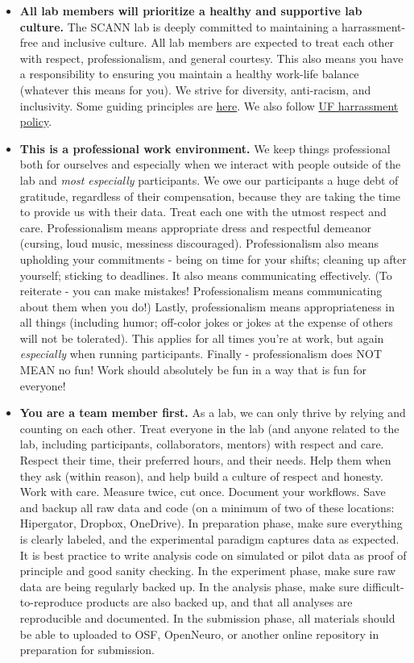 \documentclass[
  12pt,
]{book}
\begin{document}
\begin{itemize}
\item
  \textbf{All lab members will prioritize a healthy and supportive lab culture.}
  The SCANN lab is deeply committed to maintaining a harrassment-free and inclusive culture. All lab members are expected to treat each other with respect, professionalism, and general courtesy. This also means you have a responsibility to ensuring you maintain a healthy work-life balance (whatever this means for you). We strive for diversity, anti-racism, and inclusivity. Some guiding principles are \href{https://coco-net.org/wp-content/uploads/2019/11/Coco-WhiteSupCulture-ENG4.pdf}{here}. We also follow \href{https://hr.ufl.edu/forms-policies/policies-managers/sexual-harassment/}{UF harrassment policy}.
\item
  \textbf{This is a professional work environment.}
  We keep things professional both for ourselves and especially when we interact with people outside of the lab and \emph{most especially} participants. We owe our participants a huge debt of gratitude, regardless of their compensation, because they are taking the time to provide us with their data. Treat each one with the utmost respect and care. Professionalism means appropriate dress and respectful demeanor (cursing, loud music, messiness discouraged). Professionalism also means upholding your commitments - being on time for your shifts; cleaning up after yourself; sticking to deadlines. It also means communicating effectively. (To reiterate - you can make mistakes! Professionalism means communicating about them when you do!) Lastly, professionalism means appropriateness in all things (including humor; off-color jokes or jokes at the expense of others will not be tolerated). This applies for all times you're at work, but again \emph{especially} when running participants. Finally - professionalism does NOT MEAN no fun! Work should absolutely be fun in a way that is fun for everyone!
\item
  \textbf{You are a team member first.}
  As a lab, we can only thrive by relying and counting on each other. Treat everyone in the lab (and anyone related to the lab, including participants, collaborators, mentors) with respect and care. Respect their time, their preferred hours, and their needs. Help them when they ask (within reason), and help build a culture of respect and honesty.
  Work with care. Measure twice, cut once. Document your workflows. Save and backup all raw data and code (on a minimum of two of these locations: Hipergator, Dropbox, OneDrive). In preparation phase, make sure everything is clearly labeled, and the experimental paradigm captures data as expected. It is best practice to write analysis code on simulated or pilot data as proof of principle and good sanity checking. In the experiment phase, make sure raw data are being regularly backed up. In the analysis phase, make sure difficult-to-reproduce products are also backed up, and that all analyses are reproducible and documented. In the submission phase, all materials should be able to uploaded to OSF, OpenNeuro, or another online repository in preparation for submission.

\end{itemize}
\end{document}
